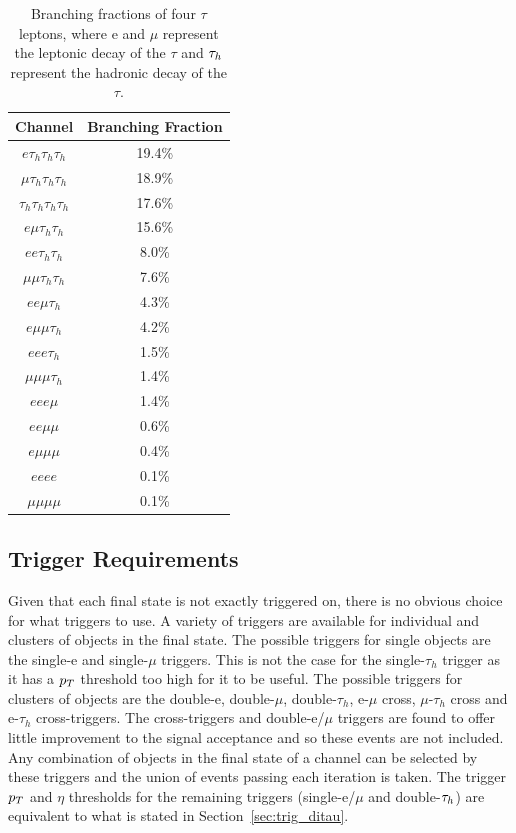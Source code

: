 \begin{table}[H]
    \centering
    \begin{tabular}{|c|c|}
         \hline
         Channel & Branching Fraction  \\
         \hline
         \hline
         $e \tau_h \tau_h \tau_h$ & 19.4\% \\
         $\mu \tau_h \tau_h \tau_h$ & 18.9\% \\
         $\tau_h \tau_h \tau_h \tau_h$ & 17.6\% \\
         $e \mu \tau_h \tau_h$ & 15.6\% \\
         $e e \tau_h \tau_h$ & 8.0\% \\
         $\mu \mu \tau_h \tau_h$ & 7.6\% \\
         $e e \mu \tau_h$ & 4.3\% \\
         $e \mu \mu \tau_h$ & 4.2\% \\
         $e e e \tau_h$ & 1.5\% \\
         $\mu \mu \mu \tau_h$ & 1.4\% \\
         $e e e \mu$ & 1.4\% \\
         $e e \mu \mu$ & 0.6\% \\
         $e \mu \mu \mu$ & 0.4\% \\
         $e e e e$ & 0.1\% \\
         $\mu \mu \mu \mu$ & 0.1\% \\
         \hline
    \end{tabular}
    \caption{Branching fractions of four $\tau$ leptons, where e and $\mu$ represent the leptonic decay of the $\tau$ and $\tau_{h}$ represent the hadronic decay of the $\tau$.}
    \label{tab:4tau_bf} 
\end{table}

\subsection{Trigger Requirements}

Given that each final state is not exactly triggered on, there is no obvious choice for what triggers to use. 
A variety of triggers are available for individual and clusters of objects in the final state. 
The possible triggers for single objects are the single-e and single-$\mu$ triggers. 
This is not the case for the single-$\tau_h$ trigger as it has a $p_{T}$ threshold too high for it to be useful. 
The possible triggers for clusters of objects are the double-e, double-$\mu$, double-$\tau_h$, e-$\mu$ cross, $\mu$-$\tau_h$ cross and e-$\tau_h$ cross-triggers.
The cross-triggers and double-e/$\mu$ triggers are found to offer little improvement to the signal acceptance and so these events are not included.
Any combination of objects in the final state of a channel can be selected by these triggers and the union of events passing each iteration is taken. 
The trigger $p_{T}$ and $\eta$ thresholds for the remaining triggers (single-e/$\mu$ and double-$\tau_{h}$) are equivalent to what is stated in Section~\ref{sec:trig_ditau}.


